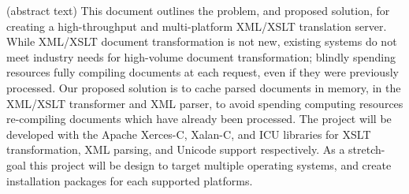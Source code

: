 (abstract text)
This document outlines the problem, and proposed solution, for creating a high-throughput and multi-platform XML/XSLT
translation server. While XML/XSLT document transformation is not new, existing systems do not meet industry needs for
high-volume document transformation; blindly spending resources fully compiling documents at each request, even if they
were previously processed. Our proposed solution is to cache parsed documents in memory, in the XML/XSLT transformer and
XML parser, to avoid spending computing resources re-compiling documents which have already been processed. The project
will be developed with the Apache Xerces-C, Xalan-C, and ICU libraries for XSLT transformation, XML parsing, and Unicode
support respectively. As a stretch-goal this project will be design to target multiple operating systems, and create installation
packages for each supported platforms.

